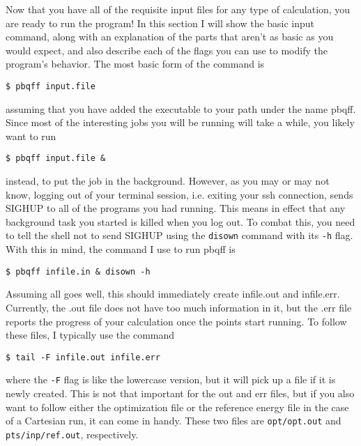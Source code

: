 \documentclass{article}
\begin{document}
Now that you have all of the requisite input files for any type of
calculation, you are ready to run the program! In this section I will
show the basic input command, along with an explanation of the parts
that aren't as basic as you would expect, and also describe each of
the flags you can use to modify the program's behavior. The most basic
form of the command is

\begin{verbatim}
$ pbqff input.file
\end{verbatim}

\noindent
assuming that you have added the executable to your path under the
name pbqff. Since most of the interesting jobs you will be running will
take a while, you likely want to run

\begin{verbatim}
$ pbqff input.file & 
\end{verbatim}

\noindent
instead, to put the job in the background. However, as you may or may
not know, logging out of your terminal session, i.e. exiting your ssh
connection, sends SIGHUP to all of the programs you had running. This
means in effect that any background task you started is killed when
you log out. To combat this, you need to tell the shell not to send
SIGHUP using the \verb|disown| command with its \verb|-h| flag. With this in mind, the
command I use to run pbqff is 

\begin{verbatim}
$ pbqff infile.in & disown -h
\end{verbatim}

Assuming all goes well, this should immediately create infile.out and
infile.err. Currently, the .out file does not have too much
information in it, but the .err file reports the progress of your
calculation once the points start running. To follow these files, I
typically use the command

\begin{verbatim}
$ tail -F infile.out infile.err
\end{verbatim}

\noindent
where the \verb|-F| flag is like the lowercase version, but it will
pick up a file if it is newly created. This is not that important for
the out and err files, but if you also want to follow either the
optimization file or the reference energy file in the case of a
Cartesian run, it can come in handy. These two files are
\verb|opt/opt.out| and \verb|pts/inp/ref.out|, respectively.
\end{document}
